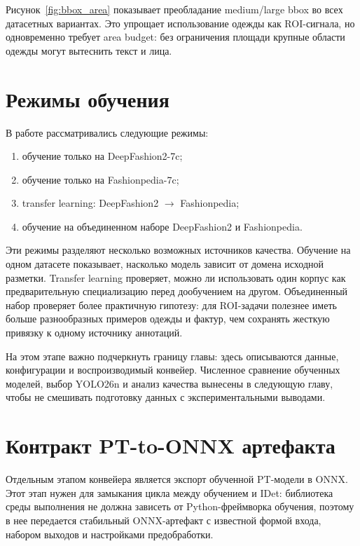 \documentclass[12pt,a4paper,oneside,openany]{report}
\begin{document}
Рисунок~\ref{fig:bbox_area} показывает преобладание medium/large bbox во всех датасетных
вариантах. Это упрощает использование одежды как ROI-сигнала, но одновременно требует area
budget: без ограничения площади крупные области одежды могут вытеснить текст и лица.


\section{Режимы обучения}

В работе рассматривались следующие режимы:
\begin{enumerate}[label=\arabic*)]
  \item обучение только на DeepFashion2-7c;
  \item обучение только на Fashionpedia-7c;
  \item transfer learning: DeepFashion2 $\rightarrow$ Fashionpedia;
  \item обучение на объединенном наборе DeepFashion2 и Fashionpedia.
\end{enumerate}

Эти режимы разделяют несколько возможных источников качества. Обучение на одном датасете
показывает, насколько модель зависит от домена исходной разметки. Transfer learning проверяет,
можно ли использовать один корпус как предварительную специализацию перед дообучением на другом.
Объединенный набор проверяет более практичную гипотезу: для ROI-задачи полезнее иметь больше
разнообразных примеров одежды и фактур, чем сохранять жесткую привязку к одному источнику
аннотаций.

На этом этапе важно подчеркнуть границу главы: здесь описываются данные, конфигурации и
воспроизводимый конвейер. Численное сравнение обученных моделей, выбор YOLO26n и анализ качества
вынесены в следующую главу, чтобы не смешивать подготовку данных с экспериментальными выводами.


\section{Контракт PT-to-ONNX артефакта}

Отдельным этапом конвейера является экспорт обученной PT-модели в ONNX. Этот этап нужен для
замыкания цикла между обучением и IDet: библиотека среды выполнения не должна зависеть от
Python-фреймворка обучения, поэтому в нее передается стабильный ONNX-артефакт с известной формой
входа, набором выходов и настройками предобработки.
\end{document}
